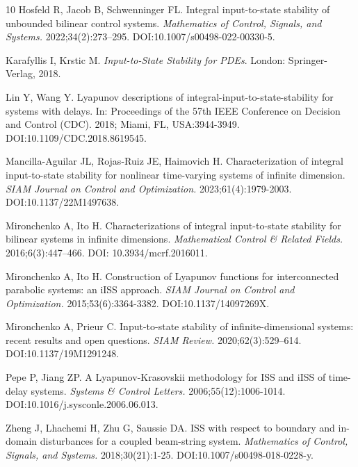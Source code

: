 \documentclass[onecolumn]{autart}
\newenvironment{proof of Prop.ODE}{{\it Proof of Proposition~\ref{Prop.ODE}:\enspace}}{\hfill $\blacksquare$\par}
\newenvironment{proof of PDE}{{\it Proof of Proposition \ref{Prop.8}:\enspace}}{\hfill $\blacksquare$\par}
\begin{document}
{{\begin{thebibliography}{10}
	Hosfeld R, Jacob B, Schwenninger FL. Integral input-to-state stability of
	unbounded bilinear control systems. {\it Mathematics of Control, Signals, and
		Systems.} 2022\string;34(2)\string:273--295.
	\newblock DOI:10.1007/s00498-022-00330-5.
	
	Karafyllis I, Krstic M. {\it Input-to-State Stability for {PDEs}}.
	\newblock London: Springer-Verlag, 2018.
	
	Lin Y, Wang Y. Lyapunov descriptions of integral-input-to-state-stability for
	systems with delays. In: Proceedings of the 57th IEEE Conference on Decision
	and Control (CDC).  2018; Miami, FL, USA\string:3944-3949.
	\newblock DOI:10.1109/CDC.2018.8619545.
	
	Mancilla-Aguilar JL, Rojas-Ruiz JE, Haimovich H. Characterization of integral
	input-to-state stability for nonlinear time-varying systems of infinite
	dimension. {\it SIAM Journal on Control and Optimization.}
	2023\string;61(4)\string:1979-2003.
	\newblock DOI:10.1137/22M1497638.
	
	Mironchenko A, Ito H. Characterizations of integral input-to-state stability
	for bilinear systems in infinite dimensions. {\it Mathematical Control \&
		Related Fields.} 2016\string;6(3)\string:447--466.
	\newblock DOI: 10.3934/mcrf.2016011.
	
	Mironchenko A, Ito H. Construction of {Lyapunov} functions for interconnected
	parabolic systems: an {{iISS}} approach. {\it SIAM Journal on Control and
		Optimization.} 2015\string;53(6)\string:3364-3382.
	\newblock DOI:10.1137/14097269X.
	
	Mironchenko A, Prieur C. Input-to-state stability of infinite-dimensional
	systems: recent results and open questions. {\it SIAM Review.}
	2020\string;62(3)\string:529--614.
	\newblock DOI:10.1137/19M1291248.
	
	Pepe P, Jiang ZP. A {L}yapunov{-K}rasovskii methodology for {ISS} and {iISS} of
	time-delay systems. {\it Systems \& Control Letters.}
	2006\string;55(12)\string:1006-1014.
	\newblock DOI:10.1016/j.sysconle.2006.06.013.
	
	Zheng J, Lhachemi H, Zhu G, Saussie DA. {ISS} with respect to boundary and
	in-domain disturbances for a coupled beam-string system. {\it Mathematics of
		Control, Signals, and Systems.} 2018\string;30(21)\string:1-25.
	\newblock DOI:10.1007/s00498-018-0228-y.
	

\end{thebibliography}}}
\end{document}
